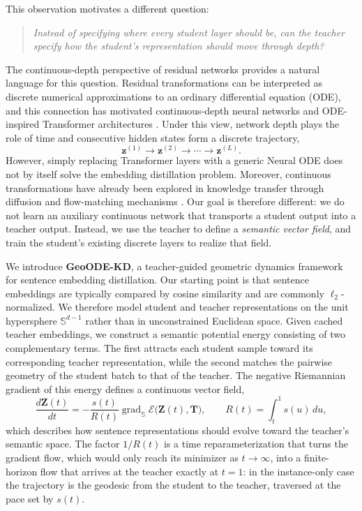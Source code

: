 \documentclass[11pt]{article}
\begin{document}
This observation motivates a different question:

\begin{quote}
\emph{Instead of specifying where every student layer should be, can the
teacher specify how the student's representation should move through
depth?}
\end{quote}

The continuous-depth perspective of residual networks provides a natural
language for this question. Residual transformations can be interpreted as
discrete numerical approximations to an ordinary differential equation
(ODE), and this connection has motivated continuous-depth neural networks
and ODE-inspired Transformer architectures
\citep{chen2018neuralode,li2022odetransformer}.
Under this view, network depth plays the role of time and consecutive
hidden states form a discrete trajectory,
\begin{equation}
    \mathbf{z}^{(1)}
    \rightarrow
    \mathbf{z}^{(2)}
    \rightarrow \cdots \rightarrow
    \mathbf{z}^{(L)}.
\end{equation}
However, simply replacing Transformer layers with a generic Neural ODE does
not by itself solve the embedding distillation problem. Moreover,
continuous transformations have already been explored in knowledge
transfer through diffusion and flow-matching mechanisms
\citep{huang2023diffkd,shao2024fmkt}.
Our goal is therefore different: we do not learn an auxiliary continuous
network that transports a student output into a teacher output.
Instead, we use the teacher to define a \emph{semantic vector field}, and
train the student's existing discrete layers to realize that field.

We introduce \textbf{GeoODE-KD}, a teacher-guided geometric dynamics
framework for sentence embedding distillation. Our starting point is that
sentence embeddings are typically compared by cosine similarity and are
commonly $\ell_2$-normalized. We therefore model student and teacher
representations on the unit hypersphere
$\mathbb{S}^{d-1}$ rather than in unconstrained Euclidean space.
Given cached teacher embeddings, we construct a semantic potential energy
consisting of two complementary terms. The first attracts each student
sample toward its corresponding teacher representation, while the second
matches the pairwise geometry of the student batch to that of the teacher.
The negative Riemannian gradient of this energy defines a continuous vector
field,
\begin{equation}
    \frac{d\mathbf{Z}(t)}{dt}
    =
    -\frac{s(t)}{R(t)}
    \operatorname{grad}_{\mathbb{S}}
    \mathcal{E}\big(\mathbf{Z}(t),\mathbf{T}\big),
    \qquad
    R(t)=\int_t^1 s(u)\,du,
\end{equation}
which describes how sentence representations should evolve toward the
teacher's semantic space. The factor $1/R(t)$ is a time reparameterization
that turns the gradient flow, which would only reach its minimizer as
$t\to\infty$, into a finite-horizon flow that arrives at the teacher
exactly at $t=1$: in the instance-only case the trajectory is the geodesic
from the student to the teacher, traversed at the pace set by $s(t)$.
\end{document}
